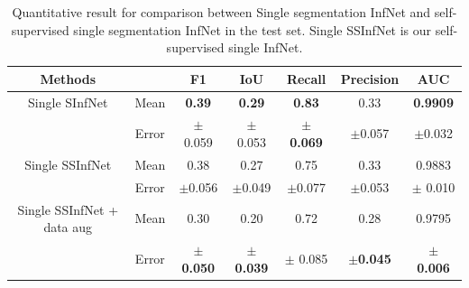  \begin{table}[!ht]
 	\centering
 	\begin{tabular}{| c | c || c c c c c ||}
 		\hline
 		Methods & & F1 & IoU & Recall & Precision & AUC \\ \hline
 		Single SInfNet &  Mean & \textbf{0.39} & \textbf{0.29} & \textbf{0.83} & 0.33 & \textbf{0.9909} \\ \cline{2-7}
 		& Error & $\pm$ 0.059 & $\pm$ 0.053 & $\pm$ \textbf{0.069} & $\pm$0.057  & $\pm$0.032 \\ \hline
 		Single SSInfNet &  Mean & 0.38 & 0.27 & 0.75 & 0.33 & 0.9883  \\ \cline{2-7}
 		& Error & $\pm$0.056 & $\pm$0.049 &$\pm$0.077  & $\pm$0.053 & $\pm$  0.010 \\ \hline
 		Single SSInfNet + data aug &  Mean & 0.30 & 0.20 & 0.72 & 0.28 &  0.9795 \\ \cline{2-7}
 		& Error & $\pm$ \textbf{0.050}  & $\pm$  \textbf{0.039} & $\pm$ 0.085 & $\pm$\textbf{0.045} & $\pm$ \textbf{0.006}  \\ \hline
 	\end{tabular}
 	\caption{Quantitative result for comparison between Single segmentation InfNet and self-supervised single segmentation InfNet in the test set. Single SSInfNet is our self-supervised single InfNet.}
 	\label{tab:single}
 \end{table}


